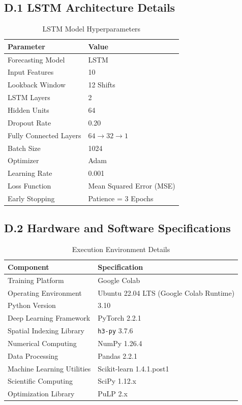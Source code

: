 \documentclass{article}
\begin{document}
\subsection*{D.1 LSTM Architecture Details}
\begin{table}[H]
\centering
\caption{LSTM Model Hyperparameters}
\label{tab:lstm_config}
\begin{tabular}{ll}
\toprule
\textbf{Parameter} & \textbf{Value} \\
\midrule
Forecasting Model & LSTM \\
Input Features & 10 \\
Lookback Window & 12 Shifts \\
LSTM Layers & 2 \\
Hidden Units & 64 \\
Dropout Rate & 0.20 \\
Fully Connected Layers & $64 \to 32 \to 1$ \\
Batch Size & 1024 \\
Optimizer & Adam \\
Learning Rate & 0.001 \\
Loss Function & Mean Squared Error (MSE) \\
Early Stopping & Patience = 3 Epochs \\
\bottomrule
\end{tabular}
\end{table}

\subsection*{D.2 Hardware and Software Specifications}
\begin{table}[H]
\centering
\caption{Execution Environment Details}
\label{tab:execution_environment}
\begin{tabular}{ll}
\toprule
\textbf{Component} & \textbf{Specification} \\
\midrule
Training Platform & Google Colab \\
Operating Environment & Ubuntu 22.04 LTS (Google Colab Runtime) \\
Python Version & 3.10 \\
Deep Learning Framework & PyTorch 2.2.1 \\
Spatial Indexing Library & \texttt{h3-py} 3.7.6 \\
Numerical Computing & NumPy 1.26.4 \\
Data Processing & Pandas 2.2.1 \\
Machine Learning Utilities & Scikit-learn 1.4.1.post1 \\
Scientific Computing & SciPy 1.12.x \\
Optimization Library & PuLP 2.x \\
\bottomrule
\end{tabular}
\end{table}
\end{document}
